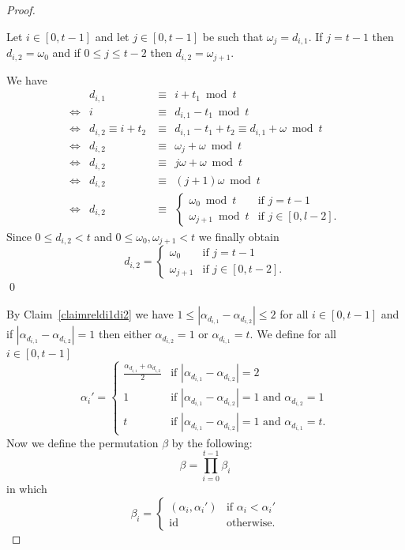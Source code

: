 \documentclass[10pt,a4paper]{amsart}
\begin{document}
\begin{proof}
\begin{claim}\label{claimreldi1di2}
Let $i \in [0,t-1]$ and let $j \in [0,t-1]$ be such that $\omega_j = d_{i,1}$. If $j=t-1$ then $d_{i,2} = \omega_0$ and if $0 \leq j \leq t-2$ then $d_{i,2} = \omega_{j+1}$.
\end{claim}
We have
\begin{eqnarray*}
& d_{i,1} & \equiv \ \ i + t_1 \bmod t\\
\Leftrightarrow & i & \equiv \ \ d_{i,1} - t_1 \bmod t\\
\Leftrightarrow & d_{i,2} \equiv i + t_2 & \equiv \ \ d_{i,1} - t_1 + t_2 \equiv d_{i,1} + \omega \bmod t\\
\Leftrightarrow & d_{i,2} & \equiv \ \ \omega_j + \omega \bmod t\\
\Leftrightarrow & d_{i,2} & \equiv \ \ j\omega + \omega \bmod t\\
\Leftrightarrow & d_{i,2} & \equiv \ \ (j+1)\omega \bmod t\\
\Leftrightarrow & d_{i,2} & \equiv \ \ \begin{cases}
\omega_0 \bmod t & \text{if } j = t-1\\
\omega_{j+1} \bmod t & \text{if } j \in [0,l-2].
\end{cases}
\end{eqnarray*}
Since $0 \leq d_{i,2} < t$ and $0 \leq \omega_0,\omega_{j+1} < t$ we finally obtain
\begin{displaymath}
d_{i,2} = \begin{cases}
\omega_0 & \text{if } j = t-1\\
\omega_{j+1} & \text{if } j \in [0,t-2].
\end{cases}
\end{displaymath}
\qed

By Claim~\ref{claimreldi1di2} we have $1 \leq |\alpha_{d_{i,1}} - \alpha_{d_{i,2}}| \leq 2$ for all $i \in [0,t-1]$ and if $|\alpha_{d_{i,1}} - \alpha_{d_{i,2}}| = 1$ then either $\alpha_{d_{i,2}} = 1$ or $\alpha_{d_{i,1}} = t$. We define for all $i \in [0,t-1]$
\begin{displaymath}
\alpha_i' = \begin{cases}
\frac{\alpha_{d_{i,1}}+\alpha_{d_{i,2}}}{2} & \text{if } |\alpha_{d_{i,1}} - \alpha_{d_{i,2}}| = 2\\
1 & \text{if } |\alpha_{d_{i,1}} - \alpha_{d_{i,2}}| = 1 \text{ and } \alpha_{d_{i,2}} = 1\\
t & \text{if } |\alpha_{d_{i,1}} - \alpha_{d_{i,2}}| = 1 \text{ and } \alpha_{d_{i,1}} = t.
\end{cases}
\end{displaymath}
Now we define the permutation $\beta$ by the following:
\begin{displaymath}
\beta = \prod_{i=0}^{t-1} \beta_i
\end{displaymath}
in which
\begin{displaymath}
\beta_i = \begin{cases}
(\alpha_i, \alpha_i') & \text{if } \alpha_i < \alpha_i'\\
\mathrm{id} & \text{otherwise}.
\end{cases}
\end{displaymath}


\end{proof}
\end{document}
